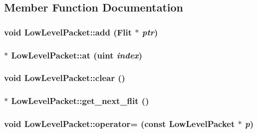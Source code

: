 \subsection{Member Function Documentation}
\hypertarget{classLowLevelPacket_b2d005a02fb4645db9145f699d330656}{
\subsubsection[{add}]{\setlength{\rightskip}{0pt plus 5cm}void LowLevelPacket::add ({\bf Flit} $\ast$ {\em ptr})}}
\label{classLowLevelPacket_b2d005a02fb4645db9145f699d330656}


\hypertarget{classLowLevelPacket_01bcea53e1afb4be73ddaa8503e053dc}{
\subsubsection[{at}]{ $\ast$ LowLevelPacket::at ({\bf uint} {\em index})}}
\label{classLowLevelPacket_01bcea53e1afb4be73ddaa8503e053dc}


\hypertarget{classLowLevelPacket_726a1d04c62dc4f20de1bcd7bebd031d}{
\subsubsection[{clear}]{\setlength{\rightskip}{0pt plus 5cm}void LowLevelPacket::clear ()}}
\label{classLowLevelPacket_726a1d04c62dc4f20de1bcd7bebd031d}


\hypertarget{classLowLevelPacket_508b439358881368b5ef646ef36b4cac}{
\subsubsection[{get\_\-next\_\-flit}]{ $\ast$ LowLevelPacket::get\_\-next\_\-flit ()}}
\label{classLowLevelPacket_508b439358881368b5ef646ef36b4cac}


\hypertarget{classLowLevelPacket_5a52c8b9499a757227a71ba51f1ef61a}{
\subsubsection[{operator=}]{\setlength{\rightskip}{0pt plus 5cm}void LowLevelPacket::operator= (const {\bf LowLevelPacket} $\ast$ {\em p})}}
\label{classLowLevelPacket_5a52c8b9499a757227a71ba51f1ef61a}


